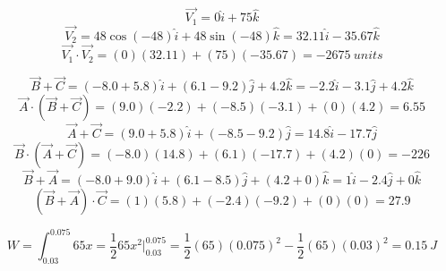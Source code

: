 \documentclass[11pt]{homework}
\begin{document}
\setcounter{questionCounter}{21}
\question
\[
    \vec{V_1} = 0 \hat{i} + 75 \hat{k}
\]
\[
    \vec{V_2} = 48\cos(-48) \hat{i} + 48\sin(-48) \hat{k} = 32.11 \hat{i} - 35.67 \hat{k}
\]
\[
    \vec{V_1} \cdot \vec{V_2} =  (0)(32.11) + (75)(-35.67) = \boxed{\qty{-2675}{units}}
\]

\setcounter{questionCounter}{24}
\question
\begin{alphaparts}
\questionpart
\[
    \vec{B} + \vec{C} = (-8.0 + 5.8)\hat{i} + (6.1-9.2)\hat{j} + 4.2 \hat{k} = -2.2 \hat{i} -3.1 \hat{j} +4.2 \hat{k}
\]
\[
    \vec{A} \cdot (\vec{B}+\vec{C}) = (9.0)(-2.2) + (-8.5)(-3.1) + (0)(4.2) = \boxed{6.55}
\]
\questionpart
\[
    \vec{A}+\vec{C} = (9.0+5.8)\hat{i} + (-8.5-9.2)\hat{j} = 14.8\hat{i} - 17.7 \hat{j}   
\]\[
\vec{B} \cdot (\vec{A}+\vec{C}) = (-8.0)(14.8) + (6.1)(-17.7) + (4.2)(0) = \boxed{-226}
\]
\questionpart
\[
    \vec{B}+\vec{A} = (-8.0+9.0)\hat{i} + (6.1-8.5)\hat{j} + (4.2+0)\hat{k} = 1\hat{i} - 2.4 \hat{j} + 0\hat{k}
\]
\[
    (\vec{B}+\vec{A}) \cdot \vec{C} = (1)(5.8) + (-2.4)(-9.2) + (0)(0) = \boxed{27.9}
\]


\end{alphaparts}

\setcounter{questionCounter}{36}
\question

\centering
{}
\[
    W = \int_{0.03}^{0.075}65x = \frac{1}{2}65x^2\Big|_{0.03}^{0.075} = \frac{1}{2}(65)(0.075)^2 - \frac{1}{2}(65)(0.03)^2 = \boxed{\qty{0.15}{J}} 
\]
\end{document}
